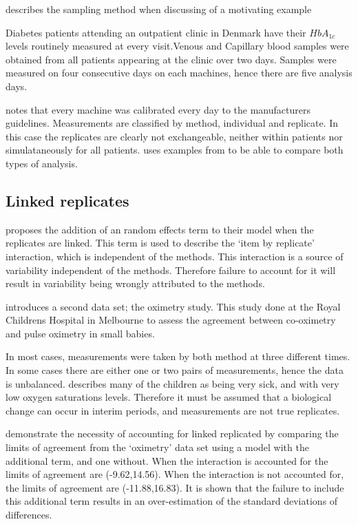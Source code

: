 \documentclass[12pt, a4paper]{report}
\theoremstyle{plain}
\theoremstyle{definition}
\theoremstyle{remark}
\begin{document}
	\newpage
	\citet{bxc2008} describes the sampling method when discussing of a motivating example
	
	Diabetes patients attending an outpatient clinic in Denmark have their $HbA_{1c}$ levels routinely measured at every visit.Venous and Capillary blood samples were obtained from all patients appearing at the clinic over two days.
	Samples were measured on four consecutive days on each machines, hence there are five analysis days.
	
	\citet{bxc2008} notes that every machine was calibrated every day to  the manufacturers guidelines.
	Measurements are classified by method, individual and replicate. In this case the replicates are clearly not exchangeable, neither within patients nor simulataneously for all patients.
	\citet{ARoy2009} uses examples from \citet{BA86} to be able to
	compare both types of analysis.
	

\subsection{Linked replicates}
	
\citet{BXC2008} proposes the addition of an random effects term to their model when the replicates are linked. This term is used to describe the `item by replicate' interaction, which is independent of the methods. This interaction is a source of variability independent of the methods. Therefore failure to account for it will result in variability being wrongly attributed to the methods.
	
\citet{BXC2008} introduces a second data set; the oximetry study. This study done at the Royal Childrens Hospital in Melbourne to assess the agreement between co-oximetry and pulse oximetry in small babies.
	
	In most cases, measurements were taken by both method at three different times. In some cases there are either one or two pairs of measurements, hence the data is unbalanced. \citet{BXC2008} describes many of the children as being very sick, and with very low oxygen saturations levels. Therefore it must be assumed that a biological change can occur in interim periods, and measurements are not true replicates.
	
	\citet{BXC2008} demonstrate the necessity of accounting for linked replicated by comparing the limits of agreement from the `oximetry' data set using a model with the additional term, and one without. When the interaction is accounted for the limits of agreement are (-9.62,14.56). When the interaction is not accounted for, the limits of agreement are (-11.88,16.83). It is shown that the failure to include this additional term results in an over-estimation of the standard deviations of differences.
	
\end{document}
